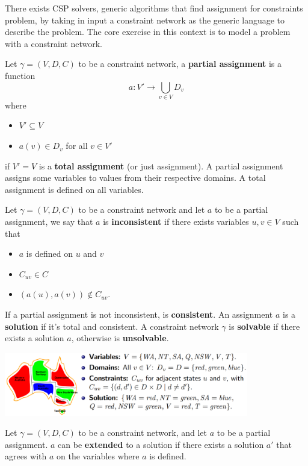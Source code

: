 \documentclass[10pt, letterpaper]{report}
\begin{document}
There exists CSP solvers, generic algorithms that find assignment for constraints problem, by taking in input a constraint network as the generic language to describe the problem. The core exercise in this context is to model a problem with a constraint network.
\begin{definition}
    Let $\gamma=(V,D,C)$ to be a constraint network, a \textbf{partial assignment} is a function $$a:V'\rightarrow \bigcup_{v\in V}D_v$$ where \begin{itemize}
        \item $V'\subseteq V$
        \item $a(v)\in D_v$ for all $v\in V'$
    \end{itemize}
    if $V'=V$ is a \textbf{total assignment} (or just assignment). A partial assignment assigns some variables to values from their
respective domains. A total assignment is defined on all variables.
\end{definition}
\begin{definition}
    Let $\gamma=(V,D,C)$ to be a constraint network and let $a$ to be a partial assignment, we say that $a$ is \textbf{inconsistent} if there exists variables $u,v\in V$ such that
\end{definition}
\begin{itemize}
        \item $a$ is defined on $u$ and $v$
        \item $C_{uv}\in C$
        \item $(a(u),a(v))\notin C_{uv}$.
    \end{itemize}
If a partial assignment is not inconsistent, is \textbf{consistent}. An assignment $a$ is a \textbf{solution} if it's total and consistent. A constraint network $\gamma$ is \textbf{solvable} if there exists a solution $a$, otherwise is \textbf{unsolvable}.\begin{center}
    \includegraphics[width=0.8\textwidth ]{images/australia2.png}
\end{center}
\begin{definition}
    Let $\gamma=(V,D,C)$ to be a constraint network, and let $a$ to be a partial assignment. $a$ can be \textbf{extended} to a solution if there exists a solution $a'$ that agrees with $a$ on the variables where $a$ is defined.
\end{definition}
\end{document}
